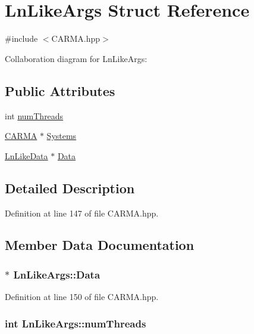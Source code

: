 \hypertarget{struct_ln_like_args}{\section{Ln\-Like\-Args Struct Reference}
\label{struct_ln_like_args}
}


{\ttfamily \#include $<$C\-A\-R\-M\-A.\-hpp$>$}



Collaboration diagram for Ln\-Like\-Args\-:
\subsection*{Public Attributes}
\begin{DoxyCompactItemize}
\item 
int \hyperlink{struct_ln_like_args_ad84da20749d9935f6a5a04b5c56d729a}{num\-Threads}
\item 
\hyperlink{class_c_a_r_m_a}{C\-A\-R\-M\-A} $\ast$ \hyperlink{struct_ln_like_args_af605bb6dcb409ad41dfc1a00c1e12c3f}{Systems}
\item 
\hyperlink{struct_ln_like_data}{Ln\-Like\-Data} $\ast$ \hyperlink{struct_ln_like_args_a33ec0460f0aa72e9ad2f044780005dcf}{Data}
\end{DoxyCompactItemize}


\subsection{Detailed Description}


Definition at line 147 of file C\-A\-R\-M\-A.\-hpp.



\subsection{Member Data Documentation}
\hypertarget{struct_ln_like_args_a33ec0460f0aa72e9ad2f044780005dcf}{
\subsubsection[{Data}]{$\ast$ Ln\-Like\-Args\-::\-Data}}\label{struct_ln_like_args_a33ec0460f0aa72e9ad2f044780005dcf}


Definition at line 150 of file C\-A\-R\-M\-A.\-hpp.

\hypertarget{struct_ln_like_args_ad84da20749d9935f6a5a04b5c56d729a}{
\subsubsection[{num\-Threads}]{\setlength{\rightskip}{0pt plus 5cm}int Ln\-Like\-Args\-::num\-Threads}}\label{struct_ln_like_args_ad84da20749d9935f6a5a04b5c56d729a}


